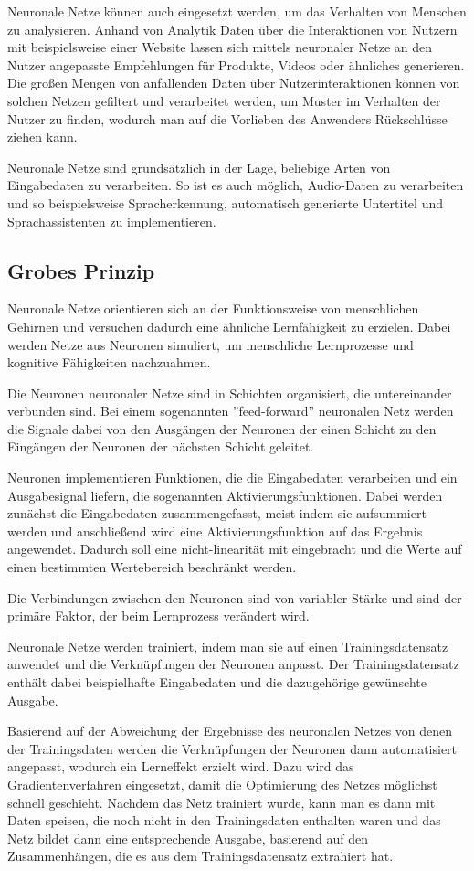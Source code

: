 \bigbreak\noindent
Neuronale Netze können auch eingesetzt werden, um das Verhalten von Menschen zu analysieren. Anhand von Analytik Daten über die Interaktionen von Nutzern mit beispielsweise einer Website lassen sich mittels neuronaler Netze an den Nutzer angepasste Empfehlungen für Produkte, Videos oder ähnliches generieren.
Die großen Mengen von anfallenden Daten über Nutzerinteraktionen können von solchen Netzen gefiltert und verarbeitet werden, um Muster im Verhalten der Nutzer zu finden, wodurch man auf die Vorlieben des Anwenders Rückschlüsse ziehen kann.

\bigbreak\noindent
Neuronale Netze sind grundsätzlich in der Lage, beliebige Arten von Eingabedaten zu verarbeiten.
So ist es auch möglich, Audio-Daten zu verarbeiten und so beispielsweise Spracherkennung, automatisch generierte Untertitel und Sprachassistenten zu implementieren.

\subsection{Grobes Prinzip}\label{subsec:einleitung_nn_grobes:prinzip}
Neuronale Netze orientieren sich an der Funktionsweise von menschlichen Gehirnen und versuchen dadurch eine ähnliche Lernfähigkeit zu erzielen.
Dabei werden Netze aus Neuronen simuliert, um menschliche Lernprozesse und kognitive Fähigkeiten nachzuahmen. 

\bigbreak\noindent
Die Neuronen neuronaler Netze sind in Schichten organisiert, die untereinander verbunden sind.
Bei einem sogenannten ''feed-forward'' neuronalen Netz werden die Signale dabei von den Ausgängen der Neuronen der einen Schicht zu den Eingängen der Neuronen der nächsten Schicht geleitet.

\bigbreak\noindent
Neuronen implementieren Funktionen, die die Eingabedaten verarbeiten und ein Ausgabesignal liefern, die sogenannten Aktivierungsfunktionen.
Dabei werden zunächst die Eingabedaten zusammengefasst, meist indem sie aufsummiert werden und anschließend wird eine Aktivierungsfunktion auf das Ergebnis angewendet. Dadurch soll eine nicht-linearität mit eingebracht und die Werte auf einen bestimmten Wertebereich beschränkt werden.

\bigbreak\noindent
Die Verbindungen zwischen den Neuronen sind von variabler Stärke und sind der primäre Faktor, der beim Lernprozess verändert wird.

\bigbreak\noindent
Neuronale Netze werden trainiert, indem man sie auf einen Trainingsdatensatz anwendet und die Verknüpfungen der Neuronen anpasst.
Der Trainingsdatensatz enthält dabei beispielhafte Eingabedaten und die dazugehörige gewünschte Ausgabe.

\bigbreak\noindent
Basierend auf der Abweichung der Ergebnisse des neuronalen Netzes von denen der Trainingsdaten werden die Verknüpfungen der Neuronen dann automatisiert angepasst, wodurch ein Lerneffekt erzielt wird.
Dazu wird das Gradientenverfahren eingesetzt, damit die Optimierung des Netzes möglichst schnell geschieht.
Nachdem das Netz trainiert wurde, kann man es dann mit Daten speisen, die noch nicht in den Trainingsdaten enthalten waren und das Netz bildet dann eine entsprechende Ausgabe, basierend auf den Zusammenhängen, die es aus dem Trainingsdatensatz extrahiert hat.